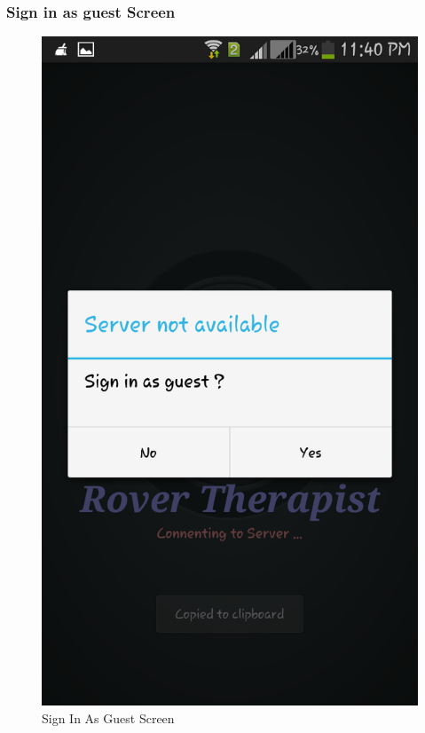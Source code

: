 \documentclass[12pt,a4paper]{article}
\begin{document}
\subsubsection{Sign in as guest Screen}
\begin{figure}[!htb]
\centering
\includegraphics[width=12 cm]{sign}
\caption{Sign In As Guest Screen}
\end{figure}
\\
\end{document}
